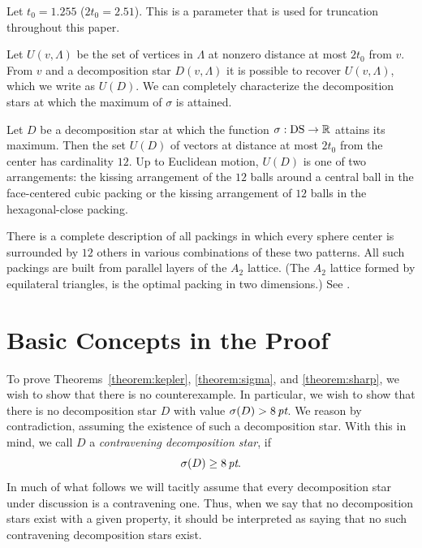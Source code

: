 Let $t_0=1.255$ ($2t_0 = 2.51$).  This is a
parameter that is used for truncation throughout this paper.
%

Let $U(v,\Lambda)$
be the set of vertices in $\Lambda$ at nonzero distance at most
$2t_0$ from $v$.  From $v$ and a decomposition star $D(v,\Lambda)$
it is possible to recover $U(v,\Lambda)$, which we write as $U(D)$.
We can completely characterize the decomposition stars at which the
maximum of $\sigma$ is attained.

\begin{theorem}
\label{theorem:sharp} Let $D$ be a decomposition star at which the
function $\sigma:{\operatorname{DS}}\to\mathbb{R}$ attains its maximum. Then the
set $U(D)$ of vectors at distance at most $2t_0$ from the center
has cardinality $12$. Up to Euclidean motion, $U(D)$ is one of two
arrangements: the kissing arrangement of the $12$ balls around a
central ball in the face-centered cubic
packing or the kissing arrangement of
$12$ balls in the hexagonal-close packing.
\end{theorem}

There is a complete description of all packings in which every
sphere center is surrounded by $12$ others in various combinations
of these two patterns. All such packings are built from parallel
layers of the $A_2$ lattice.  (The $A_2$ lattice formed by
equilateral triangles, is the optimal packing in two dimensions.)
See \longversion{\Part~\ref{part:intro}}.


\section{Basic Concepts in the Proof}
\label{sec:outline}


To prove Theorems~\ref{theorem:kepler}, \ref{theorem:sigma}, and
\ref{theorem:sharp}, we wish to show that there is no
counterexample.  In particular, we wish to show that there is no
decomposition star $D$ with value $\sigma(D)
> 8\,\hbox{\it pt}$.  We reason by contradiction, assuming the existence of
such a decomposition star.  With this in mind, we call $D$ a {\it
contravening decomposition star}, if
    $$\sigma(D)\ge 8\,\hbox{\it pt}.$$
In much of what follows we will tacitly assume that every decomposition
star under discussion is a contravening one.  Thus, when we say that no
decomposition stars exist with a given property, it should be
interpreted as saying that no such contravening decomposition stars
exist.

